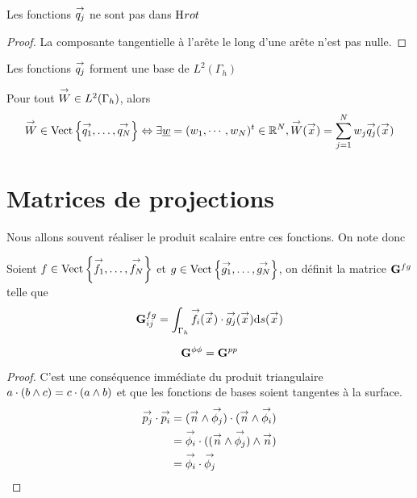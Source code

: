     \begin{prop}
      Les fonctions \(\qj\) ne sont pas dans \(\Hrot\)
    \end{prop}
    \begin{proof}
      La composante tangentielle à l'arête le long d'une arête n'est pas nulle.
    \end{proof}

    \begin{prop}
      Les fonctions \(\qj\) forment une base de \(L^2(\Gamma_h)\)
    \end{prop}

    \begin{defn}
      Pour tout \(\vect{W} \in L^2(\Gamma_h)\), alors
      \begin{equation*}
        \vect{W} \in \Vect{\vect{q_1},\ldots,\vect{q_N}} \Leftrightarrow \exists \comp{w} = (w_1,\cdots,w_N)^t \in \RR^N, \vect{W}(\vx) = \sum_{j=1}^N w_j \qj(\vx)
      \end{equation*}
    \end{defn}


\section{Matrices de projections}

  Nous allons souvent réaliser le produit scalaire entre ces fonctions. On note donc
  \begin{defn}
    Soient \(f \in \Vect{\vect{f_1},\ldots,\vect{f_N}}\) et \(g \in \Vect{\vect{g_1},\ldots,\vect{g_N}}\), on définit la matrice \(\mG{f}{g}\) telle que
    \begin{equation*}
      \mG{f}{g}_{ij} = \int_{\Gamma_h} \vect{f_i}(\vx)\cdot \vect{g_j}(\vx) \dd{s}(\vx)
    \end{equation*}
  \end{defn}

  \begin{prop}
    \begin{equation*}
      \mG{\phi}{\phi} = \mG{p}{p}
    \end{equation*}
  \end{prop}
  \begin{proof}
    C'est une conséquence immédiate du produit triangulaire \(a\cdot (b \pvect c) = c\cdot (a \pvect b)\) et que les fonctions de bases soient tangentes à la surface.
    \[
      \begin{aligned}
        \pj \cdot \pii &= (\vn \pvect \phij) \cdot ( \vn \pvect \phii)
        \\
        &= \phii \cdot ( (\vn \pvect \phij) \pvect \vn)
        \\
        &= \phii \cdot \phij
      \end{aligned}
    \]
  \end{proof}

